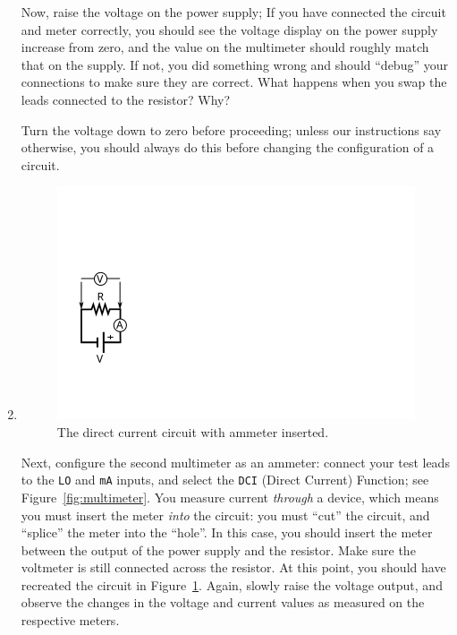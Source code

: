 \documentclass[12pt]{article}
\begin{document}
\begin{enumerate}
  Now, raise the voltage on the power supply; If you have connected
  the circuit and meter correctly, you should see the voltage display
  on the power supply increase from zero, and the value on the
  multimeter should roughly match that on the supply.  If not, you did
  something wrong and should ``debug'' your connections to make sure
  they are correct.  What happens when you swap the leads connected to
  the resistor?  Why?

  Turn the voltage down to zero before proceeding; unless our
  instructions say otherwise, you should always do this before
  changing the configuration of a circuit.
\item 
  \begin{figure}
    \centering
    \includegraphics[width=\textwidth/5]{figures/simplest_with_ammeter}
    \caption{The direct current circuit with ammeter inserted.}
    \label{fig:simplest_with_ammeter}
  \end{figure}
  Next, configure the second multimeter as an ammeter: connect your
  test leads to the \texttt{LO} and \texttt{mA} inputs, and select the
  \texttt{DCI} (Direct Current) Function; see
  Figure~\ref{fig:multimeter}.  You measure current \textit{through} a
  device, which means you must insert the meter \textit{into} the
  circuit: you must ``cut'' the circuit, and ``splice'' the meter into
  the ``hole''.  In this case, you should insert the meter between the
  output of the power supply and the resistor.  Make sure the
  voltmeter is still connected across the resistor.  At this point,
  you should have recreated the circuit in
  Figure~\ref{fig:simplest_with_ammeter}.  Again, slowly raise the
  voltage output, and observe the changes in the voltage and current
  values as measured on the respective meters.

\end{enumerate}
\end{document}
